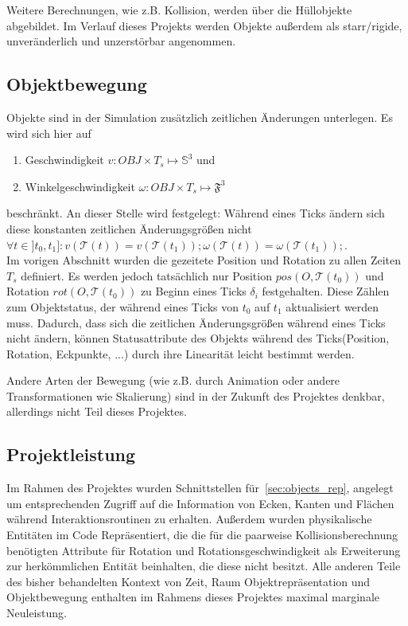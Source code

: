 Weitere Berechnungen, wie z.B. Kollision, werden über die Hüllobjekte abgebildet.
Im Verlauf dieses Projekts werden Objekte außerdem als starr/rigide, unveränderlich und unzerstörbar angenommen.

\subsection{Objektbewegung}
\label{sec:objects_mov}
Objekte sind in der Simulation zusätzlich zeitlichen Änderungen unterlegen. Es wird sich hier auf
\begin{enumerate}
\item Geschwindigkeit $v: OBJ \times T_s \mapsto \mathbb{S}^3$  und
\item Winkelgeschwindigkeit $\omega : OBJ \times T_s \mapsto \mathfrak{F}^3 $
\end{enumerate}
beschränkt.
An dieser Stelle wird festgelegt: Während eines Ticks ändern sich diese konstanten zeitlichen Änderungsgrößen nicht $\forall t \in ]t_0, t_1] : v(\mathcal{T}(t)) = v(\mathcal{T}( t_1 )); \omega(\mathcal{T}(t)) = \omega(\mathcal{T}(t_1));$.\\
Im vorigen Abschnitt wurden die gezeitete Position und Rotation zu allen Zeiten $T_s$ definiert.
Es werden jedoch tatsächlich nur Position $pos(O, \mathcal{T}(t_0))$ und Rotation $rot(O, \mathcal{T}(t_0))$ zu Beginn eines Ticks $\delta_i$ festgehalten. Diese Zählen zum Objektstatus, der während eines Ticks von $t_0$ auf $t_1$ aktualisiert werden muss. Dadurch, dass sich die zeitlichen Änderungsgrößen während eines Ticks nicht ändern, können Statusattribute des Objekts während des Ticks(Position, Rotation, Eckpunkte, ...) durch ihre Linearität leicht bestimmt werden.  

Andere Arten der Bewegung (wie z.B. durch Animation oder andere Transformationen wie Skalierung) sind in der Zukunft des Projektes denkbar, allerdings nicht Teil dieses Projektes.

\subsection{Projektleistung}
Im Rahmen des Projektes wurden Schnittstellen für~\ref{sec:objects_rep}, angelegt um entsprechenden Zugriff auf die Information von Ecken, Kanten und Flächen während Interaktionsroutinen zu erhalten. Außerdem wurden physikalische Entitäten im Code Repräsentiert, die die für die paarweise Kollisionsberechnung benötigten Attribute für Rotation und Rotationsgeschwindigkeit als Erweiterung zur herkömmlichen Entität beinhalten, die diese nicht besitzt. Alle anderen Teile des bisher behandelten Kontext von Zeit, Raum Objektrepräsentation und Objektbewegung enthalten im Rahmens dieses Projektes maximal marginale Neuleistung.


